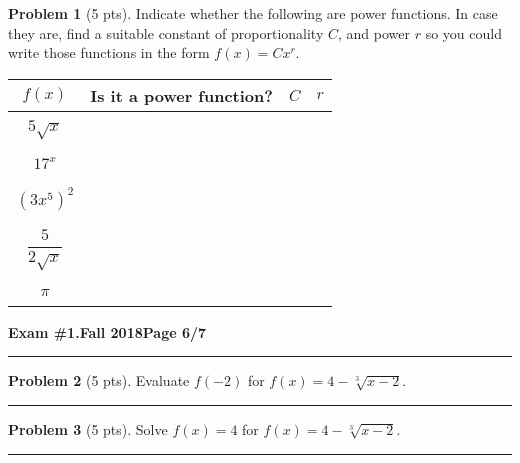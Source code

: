 \documentclass[12pt]{article}
\theoremstyle{definition}
\newtheorem{problem}{Problem}
\begin{document}
\begin{problem}[5 pts]
  Indicate whether the following are power functions. In case they are, find a suitable constant of proportionality $C$,
  and power $r$ so you could write those functions in the form $f(x) = Cx^r$. 
  \begin{center}
    \begin{tabular}{|c|c|c|c|}
      \hline
      $f(x)$ & Is it a power function? & $C$ & $r$ \\
      \hline
      \hline
             &&& \\
      $5\sqrt{x}$ &&\hspace{1cm} & \hspace{1cm} \\
             &&& \\
      \hline
             &&& \\
      $17^x$ &&& \\
             &&& \\
      \hline
             &&& \\
      $(3x^5)^2$ &&& \\
             &&& \\
      \hline
             &&& \\
      $\dfrac{5}{2\sqrt{x}}$ &&& \\
             &&& \\
      \hline
             &&& \\
      $\pi$ &&& \\
             &&& \\
      \hline
    \end{tabular}
  \end{center}
\end{problem}
\newpage


\hfill{\large\bf Exam \#1.}\hfill{\large\bf  Fall 2018}\hfill{\large\bf Page 6/7}\hrule

\bigskip
\begin{problem}[5 pts]
  Evaluate $f(-2)$ for $f(x) = 4-\sqrt[3]{x-2}$.

  \vspace{2cm}
\end{problem}
\hrule

\begin{problem}[5 pts]
  Solve $f(x)=4$ for $f(x) = 4-\sqrt[3]{x-2}$.

  \vspace{2cm}
\end{problem}
\hrule
\end{document}
